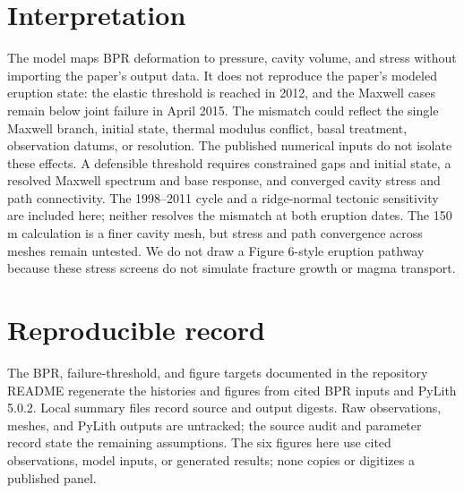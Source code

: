 \documentclass[10pt]{article}
\begin{document}
\section{Interpretation}
The model maps BPR deformation to pressure, cavity volume, and stress
without importing the paper's output data. It does not reproduce the
paper's modeled eruption state: the elastic threshold is reached in 2012,
and the Maxwell cases remain below joint failure in April 2015. The mismatch
could reflect the single
Maxwell branch, initial state, thermal modulus conflict, basal treatment,
observation datums, or resolution. The published numerical inputs do not
isolate these effects. A defensible threshold requires constrained gaps
and initial state, a resolved Maxwell spectrum and base response, and
converged cavity stress and path connectivity. The 1998--2011 cycle and a
ridge-normal tectonic sensitivity are included here; neither resolves the
mismatch at both eruption dates. The 150 m calculation is a finer cavity
mesh, but stress and path convergence across meshes remain untested.
We do not draw a Figure 6-style eruption pathway because these stress screens
do not simulate fracture growth or magma transport.

\section{Reproducible record}
The BPR, failure-threshold, and figure targets documented in the repository
README regenerate the histories and figures from cited BPR inputs and
PyLith 5.0.2. Local summary files
record source and output digests. Raw observations, meshes, and PyLith
outputs are untracked; the source audit and parameter record state the
remaining assumptions. The six figures here use cited observations,
model inputs, or generated results; none copies or digitizes a published
panel.
\end{document}
